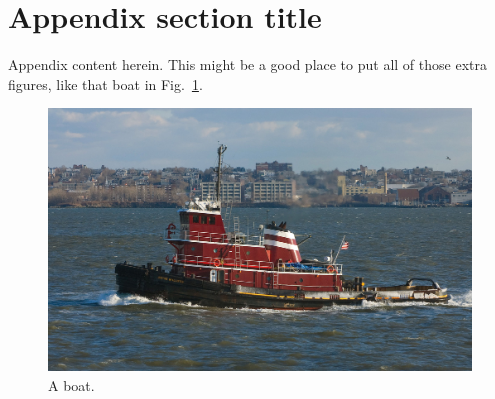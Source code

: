 \section{Appendix section title}
\label{ap:A.1}
Appendix content herein. 
This might be a good place to put all of those extra figures, 
like that boat in Fig.~\ref{fig:boat}.

\begin{figure}
  \includegraphics[width=\columnwidth]{./fig/boat.jpg}
  \caption{A boat.}
  \label{fig:boat}
\end{figure}
